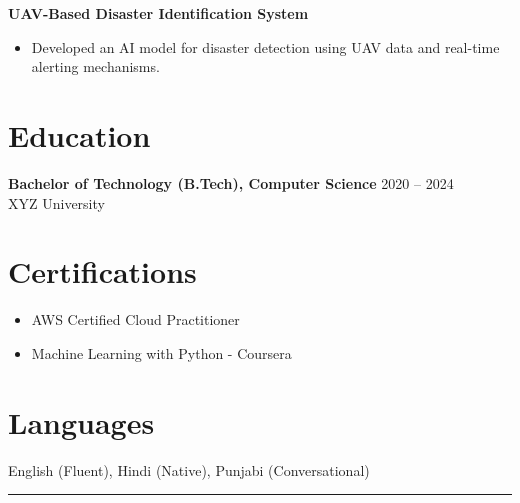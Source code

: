 \documentclass[a4paper,10pt]{article}
\begin{document}
\textbf{UAV-Based Disaster Identification System}

\begin{itemize}[noitemsep,topsep=0pt]

    \item Developed an AI model for disaster detection using UAV data and real-time alerting mechanisms.

\end{itemize}



\section*{Education}

\textbf{Bachelor of Technology (B.Tech), Computer Science} \hfill 2020 -- 2024 \\

XYZ University



\section*{Certifications}

\begin{itemize}[noitemsep,topsep=0pt]

    \item AWS Certified Cloud Practitioner

    \item Machine Learning with Python - Coursera

\end{itemize}



\section*{Languages}

English (Fluent), Hindi (Native), Punjabi (Conversational)



\hrule
\end{document}

